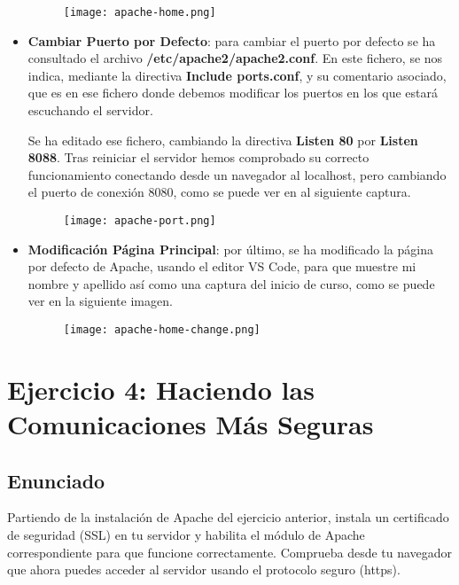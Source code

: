 \begin{itemize}
    \begin{figure}[H]
      \centering
     \texttt{[image: apache-home.png]}
    \end{figure}

    \item \textbf{Cambiar Puerto por Defecto}: para cambiar el puerto por defecto se ha consultado el archivo \textbf{/etc/apache2/apache2.conf}. En este fichero, se nos indica, mediante la directiva \textbf{Include ports.conf}, y su comentario asociado, que es en ese fichero donde debemos modificar los puertos en los que estará escuchando el servidor.

     Se ha editado ese fichero, cambiando la directiva \textbf{Listen 80} por \textbf{Listen 8088}. Tras reiniciar el servidor hemos comprobado su correcto funcionamiento conectando desde un navegador al localhost, pero cambiando el puerto de conexión 8080, como se puede ver en al siguiente captura.

     \begin{figure}[H]
         \centering
         \texttt{[image: apache-port.png]}
     \end{figure}

      \item \textbf{Modificación Página Principal}: por último, se ha modificado la página por defecto de Apache, usando el editor VS Code, para que muestre mi nombre y apellido así como una captura del inicio de curso, como se puede ver en la siguiente imagen.

      \begin{figure}[H]
          \centering
          \texttt{[image: apache-home-change.png]}
      \end{figure}
\end{itemize}

\section{Ejercicio 4: Haciendo las Comunicaciones Más Seguras}
\subsection{Enunciado}
Partiendo de la instalación de Apache del ejercicio anterior, instala un certificado de seguridad (SSL) en tu servidor y habilita el módulo de Apache correspondiente para que funcione correctamente. Comprueba desde tu navegador que ahora puedes acceder al servidor usando el protocolo seguro (https).

